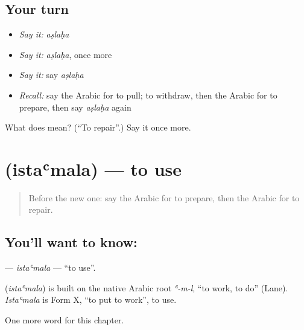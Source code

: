 \subsection*{Your turn}
\begin{itemize}
\raggedright
  \item \emph{Say it:} \emph{aṣlaḥa}
  \item \emph{Say it:} \emph{aṣlaḥa}, once more
  \item \emph{Say it:} say \emph{aṣlaḥa}
  \item \emph{Recall:} say the Arabic for to pull; to withdraw, then the Arabic for to prepare, then say \emph{aṣlaḥa} again
\end{itemize}

\begin{tcolorbox}[breakable,colback=teal!4,colframe=teal!35!black,title={Before you move on}]
What does  mean? (\textquotedblleft{}To repair\textquotedblright{}.) Say it once more.
\end{tcolorbox}
\section[\texorpdfstring{\ar{استعمل} (istaʿmala)}{استعمل (istaʿmala)}]{ (istaʿmala) — to use}

\label{lesson:AR-C225-istamala}



\begin{quote}
Before the new one: say the Arabic for to prepare, then the Arabic for to repair.
\end{quote}

\subsection*{You'll want to know: }
\textbf{} — \emph{istaʿmala} — \textquotedblleft{}to use\textquotedblright{}.

\begin{cousinweb}
\textbf{} (\emph{istaʿmala}) is built on the native Arabic root \emph{ʿ-m-l}, \textquotedblleft{}to work, to do\textquotedblright{} (Lane). \emph{Istaʿmala} is Form X, \textquotedblleft{}to put to work\textquotedblright{}, to use.
\end{cousinweb}

\begin{grammarlens}[title={What you've built}]
One more word for this chapter.
\end{grammarlens}

